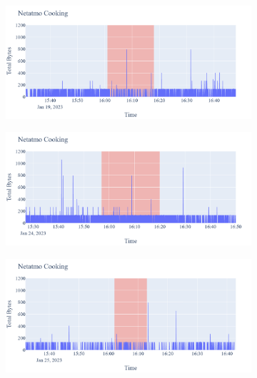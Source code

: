 \begin{figure}[H]
\begin{subfigure}[b]{0.5\textwidth}
    \end{subfigure}
    \begin{subfigure}[b]{0.5\textwidth}
        \centering
        \includegraphics[width=1.2\hsize]{figures/Netatmo_Cooking_Bytes_19.01.png}
    \end{subfigure}
    \begin{subfigure}[b]{0.5\textwidth}
        \centering
        \includegraphics[width=1.2\hsize]{figures/Netatmo_Cooking_Bytes_24.01.png}
    \end{subfigure}
    \begin{subfigure}[b]{0.5\textwidth}
        \centering
        \includegraphics[width=1.2\hsize]{figures/Netatmo_Cooking_Bytes_25.01.png}
    \end{subfigure}
    \begin{subfigure}[b]{0.5\textwidth}

\end{subfigure}
\end{figure}
